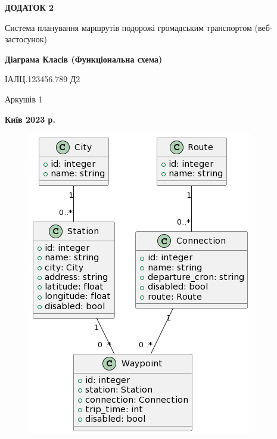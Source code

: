 \clearpage
\begin{center}
{\fontsize{18}{22}\selectfont
\textbf{\uppercase{Додаток 2}}
}

{\fontsize{16}{29}\selectfont
\bigbreak
\bigbreak
Система планування маршрутів подорожі громадським транспортом (веб-застосунок)
}

\vspace*{\fill}

{\fontsize{18}{22}\selectfont
\textbf{Діаграма Класів
(Функціональна схема)}

ІАЛЦ.123456.789 Д2
}

\vfill

{\fontsize{16}{29}\selectfont
Аркушів 1
}
\vfill %

\textbf{Київ 2023 р.}
\end{center}
\clearpage

\vspace*{\fill}
\begin{figure}[!htp]
    \centering
    \includegraphics[scale=0.6]{content/applications/assets/img/class_diagram.png}
    \label{fig:app-2}
\end{figure}
\vfill